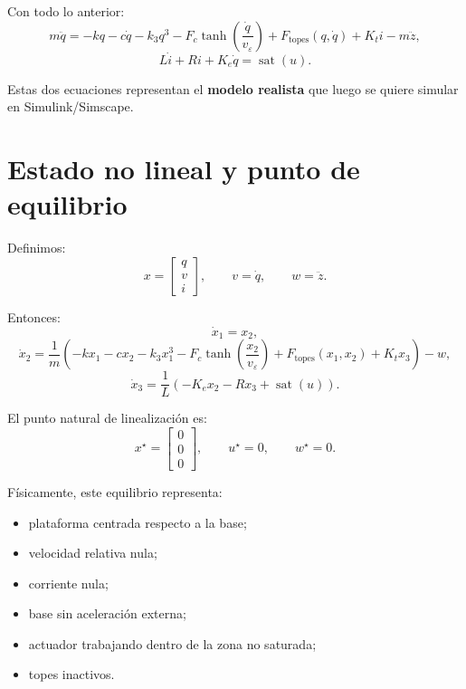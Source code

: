 \documentclass[11pt]{article}
\begin{document}
Con todo lo anterior:
\begin{equation}
m\ddot q =
-kq
-c\dot q
-k_3 q^3
-F_c \tanh\left(\frac{\dot q}{v_\varepsilon}\right)
+F_{\text{topes}}(q,\dot q)
+K_t i
-m\ddot z,
\label{eq:nonlin_mech}
\end{equation}
\begin{equation}
L\dot i + Ri + K_e\dot q = \operatorname{sat}(u).
\label{eq:nonlin_elec}
\end{equation}

Estas dos ecuaciones representan el \textbf{modelo realista} que luego se quiere simular en Simulink/Simscape.

\section{Estado no lineal y punto de equilibrio}

Definimos:
\[
x=
\begin{bmatrix}
q\\
v\\
i
\end{bmatrix},
\qquad v=\dot q,
\qquad w=\ddot z.
\]

Entonces:
\begin{equation}
\dot x_1 = x_2,
\end{equation}
\begin{equation}
\dot x_2 =
\frac{1}{m}
\left(
-kx_1
-cx_2
-k_3 x_1^3
-F_c\tanh\left(\frac{x_2}{v_\varepsilon}\right)
+F_{\text{topes}}(x_1,x_2)
+K_t x_3
\right)
-w,
\label{eq:f2}
\end{equation}
\begin{equation}
\dot x_3 =
\frac{1}{L}
\left(
-K_e x_2
-R x_3
+\operatorname{sat}(u)
\right).
\label{eq:f3}
\end{equation}

El punto natural de linealizaci\'on es:
\begin{equation}
x^\star=
\begin{bmatrix}
0\\
0\\
0
\end{bmatrix},
\qquad
u^\star=0,
\qquad
w^\star=0.
\label{eq:eqpoint}
\end{equation}

F\'isicamente, este equilibrio representa:

\begin{itemize}[leftmargin=1.2cm]
\item plataforma centrada respecto a la base;
\item velocidad relativa nula;
\item corriente nula;
\item base sin aceleraci\'on externa;
\item actuador trabajando dentro de la zona no saturada;
\item topes inactivos.
\end{itemize}
\end{document}
